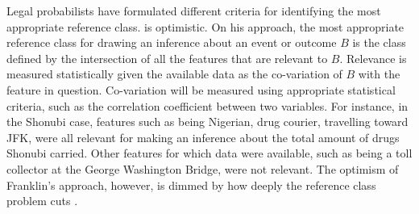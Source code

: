\documentclass{article}
\begin{document}
Legal probabilists have formulated different criteria for identifying the most appropriate reference class.  \citet{franklin2011objective} is optimistic. %
On his approach, 
the most appropriate reference class for drawing an inference about an event or outcome $B$ is the class defined by the intersection of all the features that are relevant to $B$. Relevance is 
measured statistically given the available data as the co-variation of $B$ with  the feature in question. 
Co-variation will be measured using appropriate statistical criteria, such as the correlation coefficient between two variables. 
For instance, in  the Shonubi case,  features  such as being Nigerian, drug courier, travelling toward JFK, were all relevant for making an inference about the total amount of drugs Shonubi carried.  Other features for which data were available, such as being a toll collector at the George Washington Bridge, were not relevant.
The optimism of Franklin's approach, however, is dimmed by how deeply the reference class problem cuts  \citep[for more deatails, see][]{Hajek2007}.
\end{document}
